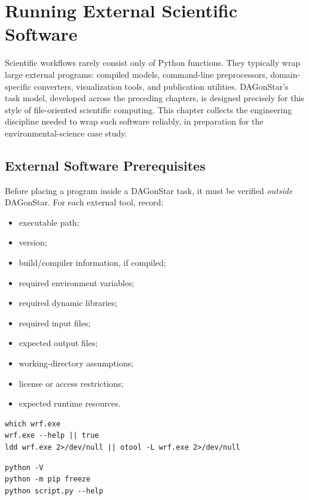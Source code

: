 \chapter{Running External Scientific Software}
\label{ch:external-software}

Scientific workflows rarely consist only of Python functions. They typically
wrap large external programs: compiled models, command-line preprocessors,
domain-specific converters, visualization tools, and publication utilities.
DAGonStar's task model, developed across the preceding chapters, is designed
precisely for this style of file-oriented scientific computing. This chapter
collects the engineering discipline needed to wrap such software reliably,
in preparation for the environmental-science case study.

\section{External Software Prerequisites}

Before placing a program inside a DAGonStar task, it must be verified
\emph{outside} DAGonStar. For each external tool, record:

\begin{itemize}[leftmargin=1.4em]
  \item executable path;
  \item version;
  \item build/compiler information, if compiled;
  \item required environment variables;
  \item required dynamic libraries;
  \item required input files;
  \item expected output files;
  \item working-directory assumptions;
  \item license or access restrictions;
  \item expected runtime resources.
\end{itemize}

\begin{lstlisting}[style=bash, caption={Verifying a compiled executable before integration.}]
which wrf.exe
wrf.exe --help || true
ldd wrf.exe 2>/dev/null || otool -L wrf.exe 2>/dev/null
\end{lstlisting}

\begin{lstlisting}[style=bash, caption={Verifying a Python tool.}]
python -V
python -m pip freeze
python script.py --help
\end{lstlisting}


